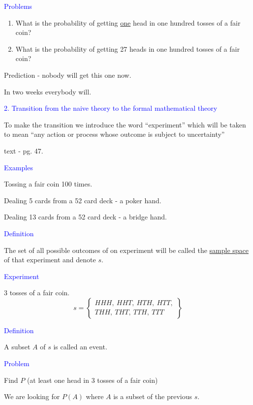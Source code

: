 \documentclass[landscape]{slides}
\begin{document}
\begin{slide}
\centerline{\textcolor{blue}{\large{Problems}}}
\begin{enumerate}
\item What is the probability of getting \underline{one} head in one hundred tosses of a fair coin?

\item What is the probability of getting 27 heads in one hundred tosses of a fair coin?
\end{enumerate}
Prediction - nobody will get this one now.

In two weeks everybody will.
\end{slide}

\begin{slide}
\begin{center}
\textcolor{blue}{\large{2. Transition from the naive theory to the formal mathematical theory}}
\end{center}

To make the transition we introduce the word ``experiment'' which will be taken to mean ``any action or process whose outcome is subject to uncertainty'' 

text - pg. 47.

\medskip

\textcolor{blue}{\large{Examples}}

Tossing a fair coin 100 times.

Dealing 5 cards from a 52 card deck - a poker hand.

Dealing 13 cards from a 52 card deck - a bridge hand.
\end{slide}

\begin{slide}
\textcolor{blue}{\large{Definition}}

The set of all possible outcomes of on experiment will be called the \underline{sample space} of that experiment and denote $s$.

\medskip
\textcolor{blue}{\large{Experiment}}

3 tosses of a fair coin. 
$$
s=
\left\{
\begin{array}{c}
HHH, \ HHT, \ HTH, \ HTT,\\[4pt]
THH, \ THT, \ TTH, \ TTT
\end{array}
\right\}
$$
\end{slide}

\begin{slide}
\textcolor{blue}{\large{Definition}}

A subset $A$ of $s$ is called an event.

\medskip
\textcolor{blue}{\large{Problem}}

Find $P$ (at least one head in 3 tosses of a fair coin)

We are looking for $P(A)$ where $A$ is a subset of the previous $s$.
\end{slide}
\end{document}
